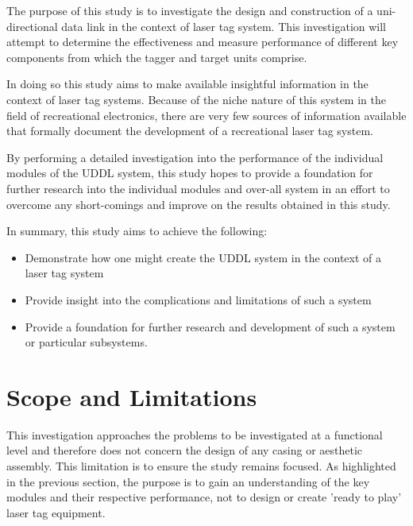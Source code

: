 
The purpose of this study is to investigate the design and construction of a uni-directional data link in the context of laser tag system. This investigation will attempt to determine the effectiveness and measure performance of different key components from which the tagger and target units comprise.

In doing so this study aims to make available insightful information in the context of laser tag systems. Because of the niche nature of this system in the field of recreational electronics, there are very few sources of information available that formally document the development of a recreational laser tag system.

By performing a detailed investigation into the performance of the individual modules of the UDDL system, this study hopes to provide a foundation for further research into the individual modules and over-all system in an effort to overcome any short-comings and improve on the results obtained in this study.

In summary, this study aims to achieve the following:

\begin{itemize}
	\item Demonstrate how one might create the UDDL system in the context of a laser tag system
	\item Provide insight into the complications and limitations of such a system
	\item Provide a foundation for further research and development of such a system or particular subsystems.
\end{itemize}


\section{Scope and Limitations}

This investigation approaches the problems to be investigated at a functional level and therefore does not concern the design of any casing or aesthetic assembly. This limitation is to ensure the study remains focused. As highlighted in the previous section, the purpose is to gain an understanding of the key modules and their respective performance, not to design or create 'ready to play' laser tag equipment.

